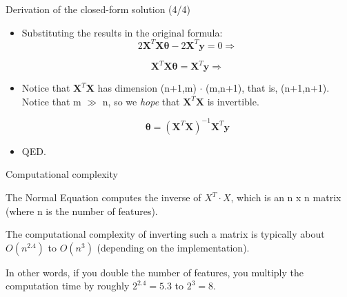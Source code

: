 \documentclass{beamer}
\begin{document}
\begin{frame}
{\centerline{Derivation of the closed-form solution (4/4) }}

\begin{itemize}
\item Substituting the results in the original formula:
  $$ 2  \boldsymbol X^T  \boldsymbol X \boldsymbol \theta - 2 \boldsymbol X^T \boldsymbol y = 0 \Rightarrow $$
  
    $$ \boldsymbol X^T  \boldsymbol X \boldsymbol \theta = \boldsymbol X^T \boldsymbol y  \Rightarrow $$
    
  \item Notice that $\boldsymbol X^T \boldsymbol X $ has dimension (n+1,m) $\cdot$ (m,n+1), that is, (n+1,n+1). Notice that m $\gg$ n, so we \textit{hope} that $\boldsymbol X^T \boldsymbol X $ is invertible.

    
        $$ \boldsymbol \theta = (\boldsymbol X^T  \boldsymbol X)^{-1}  \boldsymbol X^T \boldsymbol y  $$
        
\item QED.

\end{itemize}

\end{frame}







\begin{frame}
{\centerline{Computational complexity}}

The Normal Equation computes the inverse of $X^T \cdot X$, which is an n x n matrix (where n is the number of features). 
\newline

The computational complexity of inverting such a matrix is typically about $O( n^{2.4})$ to $O( n^3)$ (depending on the implementation). 
\newline

In other words, if you double the number of features, you multiply the computation time by roughly $2^{2.4} = 5.3$ to $2^3 = 8$.

\end{frame}
\end{document}

